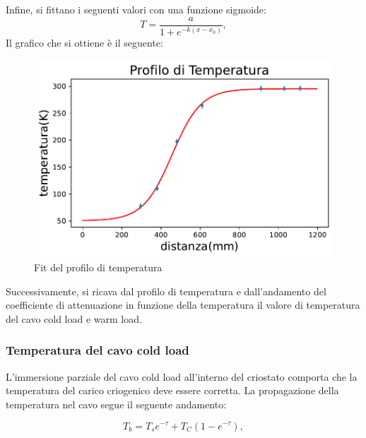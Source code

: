 Infine, si fittano i seguenti valori con una funzione sigmoide:
\begin{equation}
T= \dfrac{a}{1+e^{-k(x-x_{0})}},
\end{equation}
Il grafico che si ottiene è il seguente:
\begin{figure}[h]
	\centering
	\includegraphics[scale=0.8]{Profilo_temperatura.pdf}
	\caption{Fit del profilo di temperatura}
    	\label{fig:Profilo_temperatura}
\end{figure}

Successivamente, si ricava dal profilo di  temperatura e dall'andamento del coefficiente di attenuazione in funzione della temperatura il valore di temperatura del cavo cold load e warm load.


\subsubsection{Temperatura del cavo cold load}
\label{ssec:Temperatura del cavo cold load}

L'immersione parziale del cavo cold load all'interno del criostato comporta che la temperatura del carico criogenico deve essere corretta. La propagazione della temperatura nel cavo segue il seguente andamento:

\begin{equation}
T_{b}= T_{s}e^{-\tau} + T_{C}(1-e^{-\tau}),
\label{Formula ricorsiva}
\end{equation}


